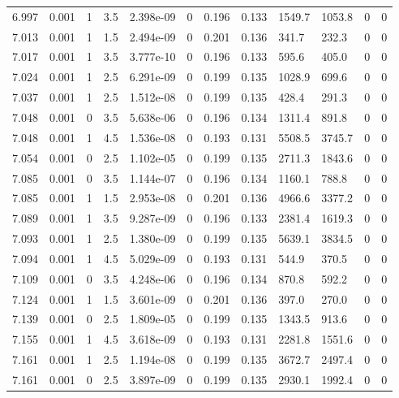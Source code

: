 \documentclass[preview]{standalone}
\begin{document}
{{{{{{{\begin{tabular}{L{1.2cm}C{1.2cm} C{0.3cm}C{0.5cm} C{1.4cm}C{1.4cm} C{1.4cm}C{1.4cm} C{1.6cm}C{1.6cm} C{1.6cm}C{1.6cm}}
  6.997  &  0.001  & 1     & 3.5 &  2.398e-09  & 0  &  0.196&   0.133& 1549.7 & 1053.8   &  0 & 0  \\ 
  7.013  &  0.001  & 1     & 1.5 &  2.494e-09  & 0  &  0.201&   0.136& 341.7 & 232.3   &  0 & 0  \\ 
  7.017  &  0.001  & 1     & 3.5 &  3.777e-10  & 0  &  0.196&   0.133& 595.6 & 405.0   &  0 & 0  \\ 
  7.024  &  0.001  & 1     & 2.5 &  6.291e-09  & 0  &  0.199&   0.135& 1028.9 & 699.6   &  0 & 0  \\ 
  7.037  &  0.001  & 1     & 2.5 &  1.512e-08  & 0  &  0.199&   0.135& 428.4 & 291.3   &  0 & 0  \\ 
  7.048  &  0.001  & 0     & 3.5 &  5.638e-06  & 0  &  0.196&   0.134& 1311.4 & 891.8   &  0 & 0  \\ 
  7.048  &  0.001  & 1     & 4.5 &  1.536e-08  & 0  &  0.193&   0.131& 5508.5 & 3745.7   &  0 & 0  \\ 
  7.054  &  0.001  & 0     & 2.5 &  1.102e-05  & 0  &  0.199&   0.135& 2711.3 & 1843.6   &  0 & 0  \\ 
  7.085  &  0.001  & 0     & 3.5 &  1.144e-07  & 0  &  0.196&   0.134& 1160.1 & 788.8   &  0 & 0  \\ 
  7.085  &  0.001  & 1     & 1.5 &  2.953e-08  & 0  &  0.201&   0.136& 4966.6 & 3377.2   &  0 & 0  \\ 
  7.089  &  0.001  & 1     & 3.5 &  9.287e-09  & 0  &  0.196&   0.133& 2381.4 & 1619.3   &  0 & 0  \\ 
  7.093  &  0.001  & 1     & 2.5 &  1.380e-09  & 0  &  0.199&   0.135& 5639.1 & 3834.5   &  0 & 0  \\ 
  7.094  &  0.001  & 1     & 4.5 &  5.029e-09  & 0  &  0.193&   0.131& 544.9 & 370.5   &  0 & 0  \\ 
  7.109  &  0.001  & 0     & 3.5 &  4.248e-06  & 0  &  0.196&   0.134& 870.8 & 592.2   &  0 & 0  \\ 
  7.124  &  0.001  & 1     & 1.5 &  3.601e-09  & 0  &  0.201&   0.136& 397.0 & 270.0   &  0 & 0  \\ 
  7.139  &  0.001  & 0     & 2.5 &  1.809e-05  & 0  &  0.199&   0.135& 1343.5 & 913.6   &  0 & 0  \\ 
  7.155  &  0.001  & 1     & 4.5 &  3.618e-09  & 0  &  0.193&   0.131& 2281.8 & 1551.6   &  0 & 0  \\ 
  7.161  &  0.001  & 1     & 2.5 &  1.194e-08  & 0  &  0.199&   0.135& 3672.7 & 2497.4   &  0 & 0  \\ 
  7.161  &  0.001  & 0     & 2.5 &  3.897e-09  & 0  &  0.199&   0.135& 2930.1 & 1992.4   &  0 & 0  \\ 

\end{tabular}}}}}}}}
\end{document}
